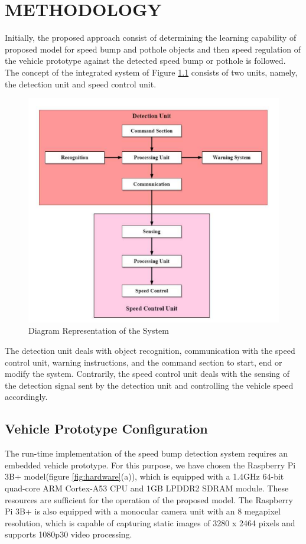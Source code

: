 \graphicspath{{Figures/chapter3}}
\chapter{METHODOLOGY}
Initially, the proposed approach consist of determining the learning capability of proposed model for speed bump and pothole objects and then speed regulation of the vehicle prototype against the detected speed bump or pothole is followed.  The concept of the integrated system of Figure \ref{fig:units} consists of two units, namely, the detection unit and speed control unit. 
\begin{figure}[h]
    \centering
    \includegraphics[scale=1]{Figures/chapter3/units.png}
    \caption{Diagram Representation of the System}
    \label{fig:units}
\end{figure}

\noindent
The detection unit deals with object recognition, communication with the speed control unit, warning instructions, and the command section to start, end or modify the system. Contrarily, the speed control unit deals with the sensing of the detection signal sent by the detection unit and controlling the vehicle speed accordingly.

\section{Vehicle Prototype Configuration}
The run-time implementation of the speed bump detection system requires an embedded vehicle prototype. For this purpose, we have chosen the Raspberry Pi 3B+ model(figure \ref{fig:hardware}(a)), which is equipped with a 1.4GHz 64-bit quad-core ARM Cortex-A53 CPU and 1GB LPDDR2 SDRAM module. These resources are sufficient for the operation of the proposed model. The Raspberry Pi 3B+ is also equipped with a monocular camera unit with an 8 megapixel resolution, which is capable of capturing static images of 3280 x 2464 pixels and supports 1080p30 video processing.

